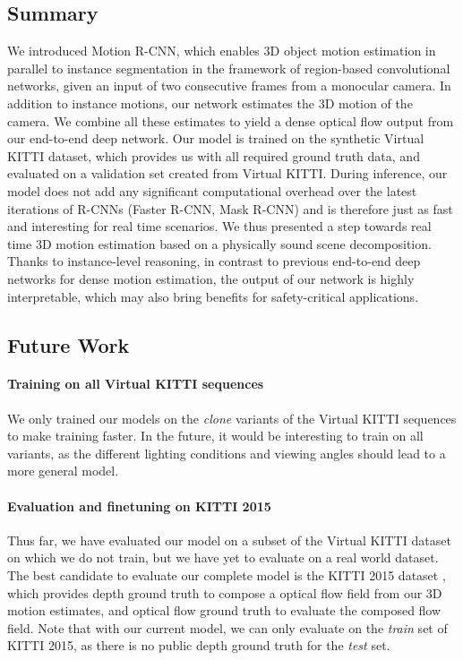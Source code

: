 \subsection{Summary}

We introduced Motion R-CNN, which enables 3D object motion estimation in parallel
to instance segmentation in the framework of region-based convolutional networks,
given an input of two consecutive frames from a monocular camera.
In addition to instance motions, our network estimates the 3D motion of the camera.
We combine all these estimates to yield a dense optical flow output from our
end-to-end deep network.
Our model is trained on the synthetic Virtual KITTI dataset, which provides
us with all required ground truth data, and evaluated on a validation set created
from Virtual KITTI.
During inference, our model does not add any significant computational overhead
over the latest iterations of R-CNNs (Faster R-CNN, Mask R-CNN) and is therefore just as fast and interesting
for real time scenarios.
We thus presented a step towards real time 3D motion estimation based on a
physically sound scene decomposition. Thanks to instance-level reasoning, in contrast
to previous end-to-end deep networks for dense motion estimation, the output
of our network is highly interpretable, which may also bring benefits for safety-critical
applications.

\subsection{Future Work}
\paragraph{Training on all Virtual KITTI sequences}
We only trained our models on the \emph{clone} variants of the Virtual KITTI sequences
to make training faster.
In the future, it would be interesting to train on all variants, as the different
lighting conditions and viewing angles should lead to a more general model.

\paragraph{Evaluation and finetuning on KITTI 2015}
Thus far, we have evaluated our model on a subset of the Virtual KITTI dataset
on which we do not train, but we have yet to evaluate on a real world dataset.
The best candidate to evaluate our complete model is the KITTI 2015 dataset \cite{KITTI2015},
which provides depth ground truth to compose a optical flow field from our 3D motion estimates,
and optical flow ground truth to evaluate the composed flow field.
Note that with our current model, we can only evaluate on the \emph{train} set
of KITTI 2015, as there is no public depth ground truth for the \emph{test} set.

